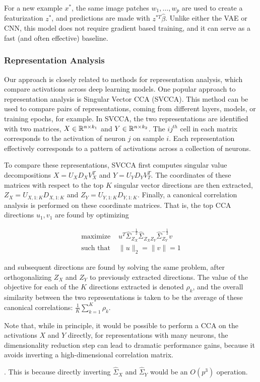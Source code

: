 For a new example $x^{\ast}$, the same image patches $w_{1}, \dots, w_{p}$ are used to create a featurization $z^{\ast}$, and predictions are made with $z^{\ast T}\hat{\beta}$. Unlike either the VAE or CNN, this model does not require gradient based training, and it can serve as a fast (and often effective) baseline.

\subsubsection{Representation Analysis}

Our approach is closely related to methods for representation analysis, which
compare activations across deep learning models. One popular approach to
representation analysis is Singular Vector CCA (SVCCA). This method can be used
to compare pairs of representations, coming from different layers, models, or
training epochs, for example. In SVCCA, the two representations are identified
with two matrices, $X \in \mathbb{R}^{n \times k_{1}}$ and $Y \in \mathbb{R}^{n \times
  k_{2}}$. The $ij^{th}$ cell in each matrix corresponds to the activation of
neuron $j$ on sample $i$. Each representation effectively corresponds to a
pattern of activations across a collection of neurons.

To compare these representations, SVCCA first computes singular value
decompositions $X = U_{X}D_{X}V_{X}^{T}$ and $Y = U_{Y}D_{Y}V_{T}^{T}$. The
coordinates of these matrices with respect to the top $K$ singular vector
directions are then extracted, $Z_{X} = U_{X, 1:K}D_{X, 1:K}$ and $Z_{Y} = U_{Y,
  1:K}D_{Y, 1:K}$. Finally, a canonical correlation analysis is performed on
these coordinate matrices. That is, the top CCA directions $u_{1}, v_{1}$ are
found by optimizing

\begin{align*}
  \text{maximize }& u^{T}\hat{\Sigma}_{Z_{X}}^{-\frac{1}{2}}\hat{\Sigma}_{Z_{X}Z_{Y}}\hat{\Sigma}_{Z_{Y}}^{-\frac{1}{2}}v \\
  \text{such that } & \|u\|_{2} = \|v\| = 1
\end{align*}

and subsequent directions are found by solving the same problem, after
orthogonalizing $Z_{X}$ and $Z_{Y}$ to previously extracted directions. The
value of the objective for each of the $K$ directions extracted is denoted
$\rho_{k}$, and the overall similarity between the two representations is taken
to be the average of these canonical correlations: $\frac{1}{K}\sum_{k = 1}^{K}
\rho_{k}$.

Note that, while in principle, it would be possible to perform a CCA on the
activations $X$ and $Y$ directly, for representations with many neurons, the
dimensionality reduction step can lead to dramatic performance gains, because it
avoids inverting a high-dimensional correlation matrix.

. This is
because directly inverting $\hat{\Sigma}_{X}$ and $\hat{\Sigma}_{Y}$ would be an $O\left(p^{3}\right)$
operation.


